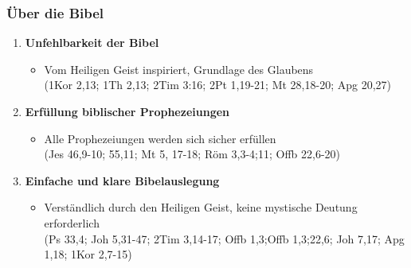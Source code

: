 \documentclass[aspectratio=43]{beamer}
\begin{document}
\begin{frame}
    \frametitle{Über die Bibel}  %
    \parbox{\textwidth}{%
        \vspace{0.55cm}
            \begin{enumerate}
                \item \textbf{Unfehlbarkeit der Bibel}
                    \begin{itemize}              
                        \item Vom Heiligen Geist inspiriert, Grundlage des Glaubens\\
                        (1Kor 2,13; 1Th 2,13; 2Tim 3:16; 2Pt 1,19-21; Mt 28,18-20; Apg 20,27)
                    \end{itemize}
                    \vspace{0.25cm}
                \item \textbf{Erfüllung biblischer Prophezeiungen}
                    \begin{itemize}
                        \item Alle Prophezeiungen werden sich sicher erfüllen\\
                        (Jes 46,9-10; 55,11; Mt 5, 17-18; Röm 3,3-4;11; Offb 22,6-20)
                    \end{itemize}
                    \vspace{0.25cm}
                \item \textbf{Einfache und klare Bibelauslegung}
                    \begin{itemize}
                        \item Verständlich durch den Heiligen Geist, keine mystische Deutung erforderlich\\
                        (Ps 33,4; Joh 5,31-47; 2Tim 3,14-17; Offb 1,3;Offb 1,3;22,6; Joh 7,17; Apg 1,18; 1Kor 2,7-15)
                    \end{itemize}    
                   
            \end{enumerate} 
            }
\end{frame}
\begin{frame}
\end{frame}
\end{document}
